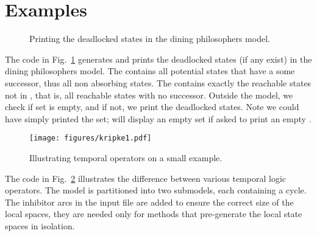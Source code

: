 \section{Examples}

\begin{figure}
  
\caption{Printing the deadlocked states in the dining philosophers model.}
\label{FIG:PhilsDeadlock}
\end{figure}


The code in Fig.~\ref{FIG:PhilsDeadlock} generates and prints
the deadlocked states (if any exist) in the dining philosophers model. 
The   contains all potential states that have a
some successor, thus all non absorbing states. The 
 contains exactly the reachable states not in , 
that is, all reachable states with no successor.
Outside the model,
we check if set  is empty, and if not, 
we print the deadlocked states.
Note we could have simply printed the set;
{\smart} will display an empty set if asked to print an empty .

\begin{figure}
  \centering
  \texttt{[image: figures/kripke1.pdf]}
  
\caption{Illustrating temporal operators on a small example.}
  \label{FIG:kripke1}
\end{figure}

The code in Fig.~\ref{FIG:kripke1} illustrates the difference between
various temporal logic operators.
The model is partitioned into two submodels, each containing a cycle.
The inhibitor arcs in the {\smart} input file are added to ensure the correct
size of the local spaces, they are needed only for methods that pre-generate
the local state spaces in isolation.

